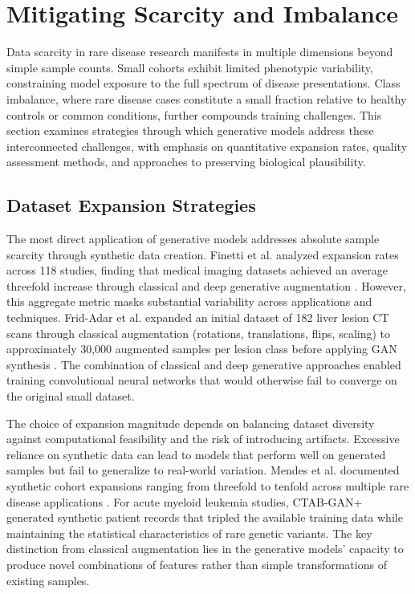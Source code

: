\section{Mitigating Scarcity and Imbalance}
\label{sec:scarcity}

Data scarcity in rare disease research manifests in multiple dimensions beyond simple sample counts. Small cohorts exhibit limited phenotypic variability, constraining model exposure to the full spectrum of disease presentations. Class imbalance, where rare disease cases constitute a small fraction relative to healthy controls or common conditions, further compounds training challenges. This section examines strategies through which generative models address these interconnected challenges, with emphasis on quantitative expansion rates, quality assessment methods, and approaches to preserving biological plausibility.

\subsection{Dataset Expansion Strategies}

The most direct application of generative models addresses absolute sample scarcity through synthetic data creation. Finetti et al. analyzed expansion rates across 118 studies, finding that medical imaging datasets achieved an average threefold increase through classical and deep generative augmentation \cite{finetti2025data}. However, this aggregate metric masks substantial variability across applications and techniques. Frid-Adar et al. expanded an initial dataset of 182 liver lesion CT scans through classical augmentation (rotations, translations, flips, scaling) to approximately 30,000 augmented samples per lesion class before applying GAN synthesis \cite{fridadar2018gan}. The combination of classical and deep generative approaches enabled training convolutional neural networks that would otherwise fail to converge on the original small dataset.

The choice of expansion magnitude depends on balancing dataset diversity against computational feasibility and the risk of introducing artifacts. Excessive reliance on synthetic data can lead to models that perform well on generated samples but fail to generalize to real-world variation. Mendes et al. documented synthetic cohort expansions ranging from threefold to tenfold across multiple rare disease applications \cite{mendes2025synthetic}. For acute myeloid leukemia studies, CTAB-GAN+ generated synthetic patient records that tripled the available training data while maintaining the statistical characteristics of rare genetic variants. The key distinction from classical augmentation lies in the generative models' capacity to produce novel combinations of features rather than simple transformations of existing samples.

